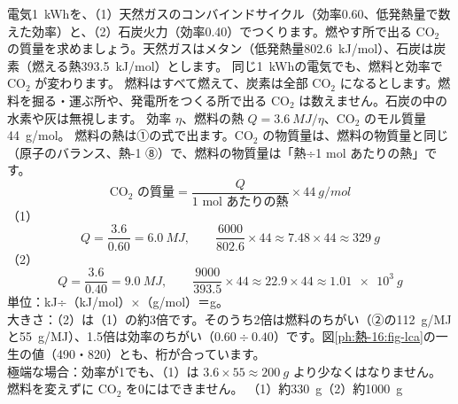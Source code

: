 \begin{phreidai}\label{ph:熱-16:ex1}
電気\qty{1}{kWh}を、（1）天然ガスのコンバインドサイクル（効率0.60、低発熱量で数えた効率）と、（2）石炭火力（効率0.40）でつくります。燃やす所で出る CO$_2$ の質量を求めましょう。天然ガスはメタン（低発熱量\qty{802.6}{kJ/mol}）、石炭は炭素（燃える熱\qty{393.5}{kJ/mol}）とします。
\phbamen
同じ\qty{1}{kWh}の電気でも、燃料と効率で CO$_2$ が変わります。
\phmushi
燃料はすべて燃えて、炭素は全部 CO$_2$ になるとします。燃料を掘る・運ぶ所や、発電所をつくる所で出る CO$_2$ は数えません。石炭の中の水素や灰は無視します。
\phzu
効率 $\eta$、燃料の熱 $Q=\qty{3.6}{MJ}/\eta$、CO$_2$ のモル質量 \qty{44}{g/mol}。
\phriyu
燃料の熱は①の式で出ます。CO$_2$ の物質量は、燃料の物質量と同じ（原子のバランス、熱-1 ⑧）で、燃料の物質量は「熱÷1 mol あたりの熱」です。
\phtateru
\[\text{CO$_2$ の質量}=\frac{Q}{\text{1 mol あたりの熱}}\times\qty{44}{g/mol}\]
\phtoku
（1）\[Q=\frac{3.6}{0.60}=\qty{6.0}{MJ},\qquad \frac{6000}{802.6}\times44\approx7.48\times44\approx\qty{329}{g}\]
（2）\[Q=\frac{3.6}{0.40}=\qty{9.0}{MJ},\qquad \frac{9000}{393.5}\times44\approx22.9\times44\approx\qty{1.01e3}{g}\]
\phtashikame
単位：kJ÷（kJ/mol）×（g/mol）＝g。\\
大きさ：（2）は（1）の約3倍です。そのうち2倍は燃料のちがい（②の\qty{112}{g/MJ}と\qty{55}{g/MJ}）、1.5倍は効率のちがい（$0.60\div0.40$）です。図\ref{ph:熱-16:fig-lca}の一生の値（490・820）とも、桁が合っています。\\
極端な場合：効率が1でも、（1）は $3.6\times55\approx\qty{200}{g}$ より少なくはなりません。燃料を変えずに CO$_2$ を0にはできません。
\kotae （1）約\qty{330}{g}（2）約\qty{1000}{g}
\end{phreidai}

